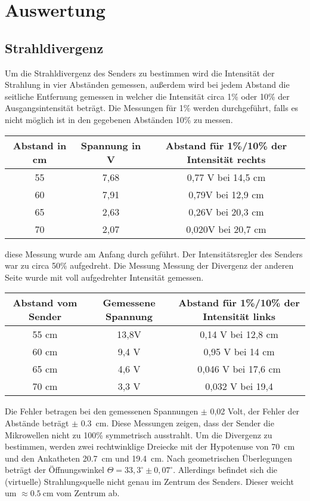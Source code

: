 \newpage
\section{Auswertung}
\subsection{Strahldivergenz}
Um die Strahldivergenz des Senders zu bestimmen wird die Intensität der Strahlung in vier Abständen gemessen, außerdem wird bei jedem Abstand die seitliche Entfernung gemessen in welcher die Intensität circa 1\% oder 10\% der Ausgangsintensität beträgt. 
Die Messungen für 1\% werden durchgeführt, falls es nicht möglich ist in den gegebenen Abständen 10\% zu messen.


\begin{tabular}{|c|c|c|}
\hline 
Abstand in cm & Spannung in V & Abstand für 1\%/10\% der Intensität rechts \\ 
\hline 
55 & 7,68 & 0,77 V bei 14,5 cm \\ 
\hline 
60 & 7,91 & 0,79V bei 12,9 cm \\ 
\hline 
65 & 2,63 & 0,26V bei 20,3 cm \\ 
\hline 
70 & 2,07 & 0,020V bei 20,7 cm \\ 
\hline 
\end{tabular} 
diese Messung wurde am Anfang durch geführt. Der Intensitätsregler des Senders war zu circa 50\% aufgedreht. 
Die Messung Messung der Divergenz der anderen Seite wurde mit voll aufgedrehter Intensität gemessen.



\begin{tabular}{|c|c|c|}
\hline 
Abstand vom Sender & Gemessene Spannung & Abstand für 1\%/10\% der Intensität links \\ 
\hline 
55 cm & 13,8V & 0,14 V bei 12,8 cm \\ 
\hline 
60 cm & 9,4 V & 0,95 V bei 14 cm \\ 
\hline 
65 cm & 4,6 V & 0,046 V bei 17,6 cm \\ 
\hline 
70 cm & 3,3 V & 0,032 V bei 19,4 \\ 
\hline 
\end{tabular} 
 Die Fehler betragen bei den gemessenen Spannungen $\pm$ 0,02 Volt, der Fehler der Abstände beträgt $\pm$ \SI{0,3}{\centi\meter}.
Diese Messungen zeigen, dass der Sender die Mikrowellen nicht zu 100\% symmetrisch ausstrahlt.
Um die Divergenz zu bestimmen, werden zwei rechtwinklige Dreiecke mit der Hypotenuse von \SI{70}{\centi\meter} und den Ankatheten \SI{20,7}{\centi\meter} und \SI{19,4}{\centi\meter}. Nach geometrischen Überlegungen beträgt der Öffnungswinkel $ \Theta  =  33,3^\circ \pm0,07^\circ $.
Allerdings befindet sich die (virtuelle) Strahlungsquelle nicht genau im Zentrum des Senders. Dieser weicht um $ \approx \SI{0,5}{\centi\meter} $  vom Zentrum ab.



